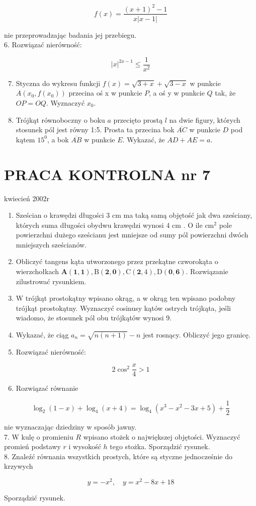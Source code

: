 \documentclass[10pt]{article}
\begin{document}
$$
f(x)=\frac{(x+1)^{2}-1}{x|x-1|}
$$

nie przeprowadzając badania jej przebiegu.\\
6. Rozwiązać nierówność:

$$
|x|^{2 x-1} \leqslant \frac{1}{x^{2}}
$$

\begin{enumerate}
  \setcounter{enumi}{6}
  \item Styczna do wykresu funkcji $f(x)=\sqrt{3+x}+\sqrt{3-x}$ w punkcie $A\left(x_{0}, f\left(x_{0}\right)\right)$ przecina oś x w punkcie $P$, a oś y w punkcie $Q$ tak, że $O P=O Q$. Wyznaczyć $x_{0}$.
  \item Trójkąt równoboczny o boku $a$ przecięto prostą $l$ na dwie figury, których stosunek pól jest równy 1:5. Prosta ta przecina bok $\overline{A C}$ w punkcie $D$ pod kątem $15^{0}$, a bok $\overline{A B}$ w punkcie $E$. Wykazać, że $A D+A E=a$.
\end{enumerate}

\section*{PRACA KONTROLNA nr 7}
kwiecień 2002r

\begin{enumerate}
  \item Sześcian o krawędzi długości 3 cm ma taką samą objętość jak dwa sześciany, których suma długości obydwu krawędzi wynosi 4 cm . O ile $\mathrm{cm}^{2}$ pole powierzchni dużego sześcianu jest mniejsze od sumy pól powierzchni dwóch mniejszych sześcianów.
  \item Obliczyć tangens kąta utworzonego przez przekątne czworokąta o wierzchołkach $\mathbf{A}(\mathbf{1}, \mathbf{1}), \mathrm{B}(\mathbf{2}, \mathbf{0}), \mathrm{C}(\mathbf{2}, 4), \mathrm{D}(\mathbf{0}, \mathbf{6})$. Rozwiązanie zilustrować rysunkiem.
  \item W trójkąt prostokątny wpisano okrąg, a w okrąg ten wpisano podobny trójkąt prostokątny. Wyznaczyć cosinusy kątów ostrych trójkąta, jeśli wiadomo, że stosunek pól obu trójkątów wynosi 9.
  \item Wykazać, że ciąg $a_{n}=\sqrt{n(n+1)}-n$ jest rosnący. Obliczyć jego granicę.
  \item Rozwiązać nierówność:
\end{enumerate}

$$
2 \cos ^{2} \frac{x}{4}>1
$$

\begin{enumerate}
  \setcounter{enumi}{5}
  \item Rozwiązać równanie
\end{enumerate}

$$
\log _{2}(1-x)+\log _{4}(x+4)=\log _{4}\left(x^{3}-x^{2}-3 x+5\right)+\frac{1}{2}
$$

nie wyznaczając dziedziny w sposób jawny.\\
7. W kulę o promieniu $R$ wpisano stożek o największej objętości. Wyznaczyć promień podstawy $r$ i wysokość $h$ tego stożka. Sporządzić rysunek.\\
8. Znaleźć równania wszystkich prostych, które są styczne jednocześnie do krzywych

$$
y=-x^{2}, \quad y=x^{2}-8 x+18
$$

Sporządzić rysunek.
\end{document}
